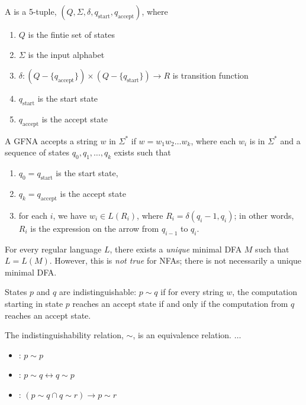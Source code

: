 \documentclass{article}
\begin{document}
\begin{definition}
  A  is a 5-tuple, $(Q,\Sigma,\delta,q_{\textrm{start}},q_{\textrm{accept}})$, where 
  \begin{enumerate}
    \item $Q$ is the fintie set of states 
    \item $\Sigma$ is the input alphabet 
    \item $\delta : (Q - \{q_{\textrm{accept}}\}) \times (Q - \{q_{\textrm{start}}\}) \rightarrow R$ is transition function
    \item $q_{\textrm{start}}$ is the start state 
    \item $q_{\textrm{accept}}$ is the accept state
  \end{enumerate}
\end{definition}

A GFNA accepts a string $w$ in $\Sigma^{*}$ if $w=w_1 w_2 \dots w_k$, where each $w_i$ is in $\Sigma^{*}$ and a sequence of states $q_0 , q_1 , \dots , q_k$ exists such that 
\begin{enumerate}
  \item $q_0 = q_{\textrm{start}}$ is the start state, 
  \item $q_k = q_{\textrm{accept}}$ is the accept state 
  \item for each $i$, we have $w_i \in L(R_i)$, where $R_i = \delta(q_i - 1, q_i)$; in other words, $R_i$ is the expression on the arrow from $q_{i-1}$ to $q_i$. 
\end{enumerate}

\begin{theorem}
  For every regular language $L$, there exists a \emph{unique} minimal DFA $M$ such that $L=L(M)$. However, this is \emph{not true} for NFAs; there is not necessarily a unique minimal DFA.  
\end{theorem}

\begin{definition}
  States $p$ and $q$ are indistinguishable: $p \sim q$ if for every string $w$, the computation starting in state $p$ reaches an accept state if and only if the computation from $q$ reaches an accept state. 
\end{definition}

\begin{lemma}
  The indistinguishability relation, $\sim$, is an equivalence relation. $\dots$
  \begin{itemize}
    \item {}: $p \sim p$ 
    \item {}: $p \sim q \leftrightarrow q \sim p$
    \item {}: $(p \sim q \cap q \sim r) \rightarrow p \sim r$
  \end{itemize}
\end{lemma}
\end{document}
